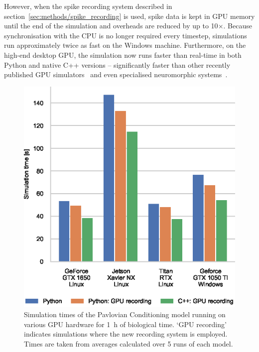 \documentclass[utf8]{frontiersSCNS} %
\begin{document}
However, when the spike recording system described in section~\ref{sec:methods/spike_recording} is used, spike data is kept in GPU memory until the end of the simulation and overheads are reduced by up to 10$\times$.
Because synchronisation with the CPU is no longer required every timestep, simulations run approximately twice as fast on the Windows machine.
Furthermore, on the high-end desktop GPU, the simulation now runs faster than real-time in both Python and native C++ versions -- significantly faster than other recently published GPU simulators~\citep{Golosio2021} and even specialised neuromorphic systems~\citep{Rhodes2019}.
%
\begin{figure}[t!]
    \begin{center}
        \includegraphics{figures/izhikevich.eps}
    \end{center}
    \caption{Simulation times of the Pavlovian Conditioning model running on various GPU hardware for \SI{1}{\hour} of biological time.
    `GPU recording' indicates simulations where the new recording system is employed.
    Times are taken from averages calculated over 5 runs of each model.}
    \label{fig:izhikevich}
\end{figure}
%
\end{document}
